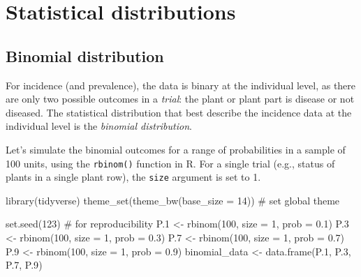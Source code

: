 \documentclass[
  letterpaper,
  DIV=11,
  numbers=noendperiod]{scrreprt}
\newenvironment{Shaded}{\begin{snugshade}}{\end{snugshade}}
\newcommand{\AttributeTok}[1]{\textcolor[rgb]{0.40,0.45,0.13}{#1}}
\newcommand{\CommentTok}[1]{\textcolor[rgb]{0.37,0.37,0.37}{#1}}
\newcommand{\DecValTok}[1]{\textcolor[rgb]{0.68,0.00,0.00}{#1}}
\newcommand{\FloatTok}[1]{\textcolor[rgb]{0.68,0.00,0.00}{#1}}
\newcommand{\FunctionTok}[1]{\textcolor[rgb]{0.28,0.35,0.67}{#1}}
\newcommand{\NormalTok}[1]{\textcolor[rgb]{0.00,0.23,0.31}{#1}}
\newcommand{\OtherTok}[1]{\textcolor[rgb]{0.00,0.23,0.31}{#1}}
\begin{document}
\hypertarget{statistical-distributions}{%
\section{Statistical distributions}\label{statistical-distributions}}

\hypertarget{binomial-distribution}{%
\subsection{Binomial distribution}\label{binomial-distribution}}

For incidence (and prevalence), the data is binary at the individual
level, as there are only two possible outcomes in a \emph{trial}: the
plant or plant part is disease or not diseased. The statistical
distribution that best describe the incidence data at the individual
level is the \emph{binomial distribution}.

Let's simulate the binomial outcomes for a range of probabilities in a
sample of 100 units, using the \texttt{rbinom()} function in R. For a
single trial (e.g., status of plants in a single plant row), the
\texttt{size} argument is set to 1.

\begin{Shaded}
\begin{Highlighting}[]
\FunctionTok{library}\NormalTok{(tidyverse)}
\FunctionTok{theme\_set}\NormalTok{(}\FunctionTok{theme\_bw}\NormalTok{(}\AttributeTok{base\_size =} \DecValTok{14}\NormalTok{)) }\CommentTok{\# set global theme}

\FunctionTok{set.seed}\NormalTok{(}\DecValTok{123}\NormalTok{) }\CommentTok{\# for reproducibility}
\NormalTok{P}\FloatTok{.1} \OtherTok{\textless{}{-}} \FunctionTok{rbinom}\NormalTok{(}\DecValTok{100}\NormalTok{, }\AttributeTok{size =} \DecValTok{1}\NormalTok{, }\AttributeTok{prob =} \FloatTok{0.1}\NormalTok{)}
\NormalTok{P}\FloatTok{.3} \OtherTok{\textless{}{-}} \FunctionTok{rbinom}\NormalTok{(}\DecValTok{100}\NormalTok{, }\AttributeTok{size =} \DecValTok{1}\NormalTok{, }\AttributeTok{prob =} \FloatTok{0.3}\NormalTok{)}
\NormalTok{P}\FloatTok{.7} \OtherTok{\textless{}{-}} \FunctionTok{rbinom}\NormalTok{(}\DecValTok{100}\NormalTok{, }\AttributeTok{size =} \DecValTok{1}\NormalTok{, }\AttributeTok{prob =} \FloatTok{0.7}\NormalTok{)}
\NormalTok{P}\FloatTok{.9} \OtherTok{\textless{}{-}} \FunctionTok{rbinom}\NormalTok{(}\DecValTok{100}\NormalTok{, }\AttributeTok{size =} \DecValTok{1}\NormalTok{, }\AttributeTok{prob =} \FloatTok{0.9}\NormalTok{)}
\NormalTok{binomial\_data }\OtherTok{\textless{}{-}} \FunctionTok{data.frame}\NormalTok{(P}\FloatTok{.1}\NormalTok{, P}\FloatTok{.3}\NormalTok{, P}\FloatTok{.7}\NormalTok{, P}\FloatTok{.9}\NormalTok{)}
\end{Highlighting}
\end{Shaded}
\end{document}
